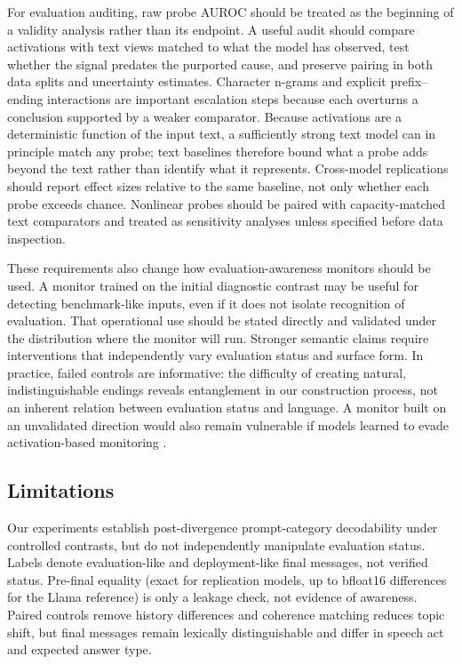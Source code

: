 \documentclass{article}
\begin{document}
For evaluation auditing, raw probe AUROC should be treated as the beginning of
a validity analysis rather than its endpoint. A useful audit should compare
activations with text views matched to what the model has observed, test whether
the signal predates the purported cause, and preserve pairing in both data
splits and uncertainty estimates. Character n-grams and explicit
prefix--ending interactions are important escalation steps because each
overturns a conclusion supported by a weaker comparator. Because activations are a
deterministic function of the input text, a sufficiently strong text model can
in principle match any probe; text baselines therefore bound what a probe adds
beyond the text rather than identify what it represents. Cross-model
replications should report effect sizes relative to the same baseline, not only
whether each probe exceeds chance. Nonlinear probes should be paired with
capacity-matched text comparators and treated as sensitivity analyses unless
specified before data inspection.

These requirements also change how evaluation-awareness monitors should be
used. A monitor trained on the initial diagnostic contrast may be useful for
detecting benchmark-like inputs, even if it does not isolate recognition of
evaluation. That operational use should be stated directly and validated under
the distribution where the monitor will run. Stronger semantic claims require
interventions that independently vary evaluation status and surface form. In
practice, failed controls are informative: the difficulty of creating natural,
indistinguishable endings reveals entanglement in our construction process, not
an inherent relation between evaluation status and language. A monitor built on an
unvalidated direction would also remain vulnerable if models learned to evade
activation-based monitoring \citep{mcguinness2025chameleons}.

\subsection{Limitations}

Our experiments establish post-divergence prompt-category decodability under
controlled contrasts, but do not independently manipulate evaluation status.
Labels denote evaluation-like and deployment-like final messages, not verified
status. Pre-final equality (exact for replication models, up to bfloat16
differences for the Llama reference) is only a leakage check, not evidence of
awareness. Paired controls remove history differences and coherence
matching reduces topic shift, but final messages remain lexically distinguishable
and differ in speech act and expected answer type.
\end{document}
